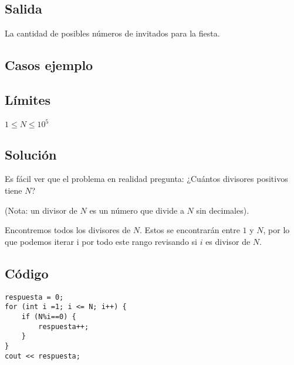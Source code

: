 \subsection*{Salida}
La cantidad de posibles números de invitados para la fiesta.
\subsection*{Casos ejemplo}
\begin{casebox2}
\end{casebox2}
\subsection*{Límites}
\begin{plimits}
	\item \(1\leq N \leq 10^5\)
\end{plimits}

\subsection*{Solución}
Es fácil ver que el problema en realidad pregunta: ¿Cuántos divisores positivos tiene \(N\)?

(Nota: un divisor de \(N\) es un número que divide a \(N\) sin decimales).

Encontremos todos los divisores de \(N\). Estos se encontrarán entre \(1\) y \(N\), por lo que podemos iterar i por todo este rango revisando si \(i\) es divisor de \(N\).
\subsection*{Código}
\begin{lstlisting}
respuesta = 0;
for (int i =1; i <= N; i++) {
	if (N%i==0) {
		respuesta++;
	}
}
cout << respuesta;
\end{lstlisting}
\newpage
{}

\problemtitle 

\problembreak

\problemtitle 

\problembreak

\problemtitle 

\problembreak

\problemtitle 

\problembreak

\problemtitle 
